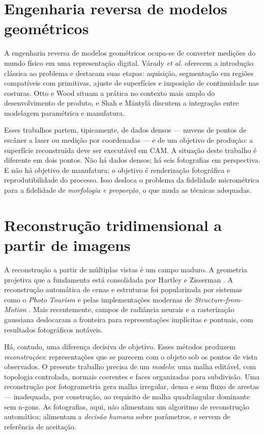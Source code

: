 \section{Engenharia reversa de modelos geom\'etricos}

A engenharia reversa de modelos geom\'etricos ocupa-se de converter medi\c{c}\~oes do mundo
f\'isico em uma representa\c{c}\~ao digital. V\'arady \emph{et al.} \cite{varady1997} oferecem a
introdu\c{c}\~ao cl\'assica ao problema e destacam suas etapas: aquisi\c{c}\~ao, segmenta\c{c}\~ao
em regi\~oes compat\'iveis com primitivas, ajuste de superf\'icies e imposi\c{c}\~ao de
continuidade nas costuras. Otto e Wood \cite{otto2001} situam a pr\'atica no contexto mais
amplo do desenvolvimento de produto, e Shah e M\"antyl\"a \cite{shah1995} discutem a
integra\c{c}\~ao entre modelagem param\'etrica e manufatura.

Esses trabalhos partem, tipicamente, de dados densos --- nuvens de pontos de esc\^aner a laser ou
medi\c{c}\~ao por coordenadas --- e de um objetivo de produ\c{c}\~ao: a superf\'icie reconstru\'ida
deve ser execut\'avel em CAM. A situa\c{c}\~ao deste trabalho \'e diferente em dois pontos. N\~ao
h\'a dados densos; h\'a seis fotografias em perspectiva. E n\~ao h\'a objetivo de manufatura; o
objetivo \'e renderiza\c{c}\~ao fotogr\'afica e reprodutibilidade do processo. Isso desloca o
problema da fidelidade microm\'etrica para a fidelidade de \emph{morfologia e proporção}, o que
muda as t\'ecnicas adequadas.

\section{Reconstru\c{c}\~ao tridimensional a partir de imagens}

A reconstru\c{c}\~ao a partir de m\'ultiplas vistas \'e um campo maduro. A geometria
projetiva que a fundamenta est\'a consolidada por Hartley e Zisserman \cite{hartley2004}. A
reconstru\c{c}\~ao autom\'atica de cenas e estruturas foi popularizada por sistemas como o
\emph{Photo Tourism} \cite{snavely2006} e pelas implementa\c{c}\~oes modernas de
\emph{Structure-from-Motion} \cite{schonberger2016}. Mais recentemente, campos de
radi\^ancia neurais \cite{mildenhall2020} e a rasteriza\c{c}\~ao gaussiana
\cite{kerbl2023} deslocaram a fronteira para representa\c{c}\~oes impl\'icitas e
pontuais, com resultados fotogr\'aficos not\'aveis.

H\'a, contudo, uma diferen\c{c}a decisiva de objetivo. Esses m\'etodos produzem
\emph{reconstru\c{c}\~oes}: representa\c{c}\~oes que se parecem com o objeto sob os pontos de
vista observados. O presente trabalho precisa de um \emph{modelo}: uma malha edit\'avel, com
topologia controlada, normais coerentes e faces organizadas para subdivis\~ao. Uma
reconstru\c{c}\~ao por fotogrametria gera malha irregular, densa e sem fluxo de arestas ---
inadequada, por constru\c{c}\~ao, ao requisito de malha quadr\^angular dominante sem n-gons.
As fotografias, aqui, n\~ao alimentam um algoritmo de reconstru\c{c}\~ao autom\'atica; alimentam
a \emph{decis\~ao humana} sobre par\^ametros, e servem de refer\^encia de aceita\c{c}\~ao.

